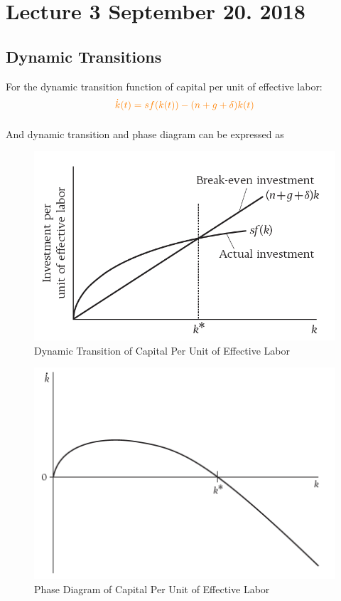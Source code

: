 \documentclass[]{article}
\begin{document}
	\section{Lecture 3 September 20. 2018}
		\subsection{Dynamic Transitions}
			\begin{remark}
				For the dynamic transition function of capital per unit of effective labor:
				\begin{equation}
				\textcolor{orange}{
					\dot{k}(t) = sf(k(t)) - (n+g+\delta)k(t)
					}
				\end{equation}
			\end{remark}
			\paragraph{} And dynamic transition and phase diagram can be expressed as
			\begin{figure}[h]
				\centering
				\includegraphics[width=0.6\linewidth]{figures/3_1.png}
				\caption{Dynamic Transition of Capital Per Unit of Effective Labor}
			\end{figure}
			
			\begin{figure}[h]
				\centering
				\includegraphics[width=0.6\linewidth]{figures/3_2.png}
				\caption{Phase Diagram of Capital Per Unit of Effective Labor}
			\end{figure}
			
\end{document}
